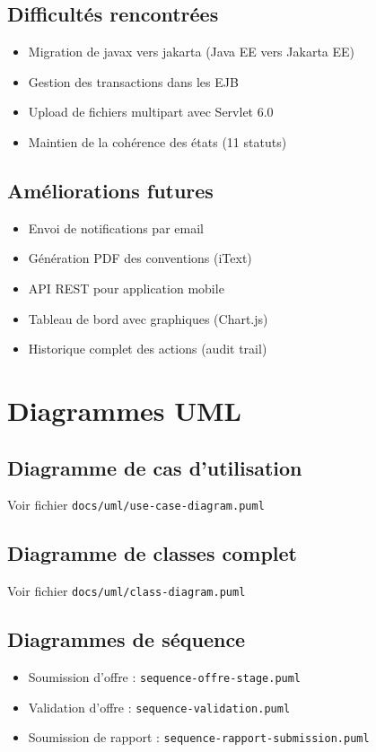 \documentclass[12pt,a4paper]{report}
\begin{document}
\section{Difficultés rencontrées}
\begin{itemize}
    \item Migration de javax vers jakarta (Java EE vers Jakarta EE)
    \item Gestion des transactions dans les EJB
    \item Upload de fichiers multipart avec Servlet 6.0
    \item Maintien de la cohérence des états (11 statuts)
\end{itemize}

\section{Améliorations futures}
\begin{itemize}
    \item Envoi de notifications par email
    \item Génération PDF des conventions (iText)
    \item API REST pour application mobile
    \item Tableau de bord avec graphiques (Chart.js)
    \item Historique complet des actions (audit trail)
\end{itemize}

\appendix
\chapter{Diagrammes UML}

\section{Diagramme de cas d'utilisation}
Voir fichier \texttt{docs/uml/use-case-diagram.puml}

\section{Diagramme de classes complet}
Voir fichier \texttt{docs/uml/class-diagram.puml}

\section{Diagrammes de séquence}
\begin{itemize}
    \item Soumission d'offre : \texttt{sequence-offre-stage.puml}
    \item Validation d'offre : \texttt{sequence-validation.puml}
    \item Soumission de rapport : \texttt{sequence-rapport-submission.puml}
\end{itemize}
\end{document}
